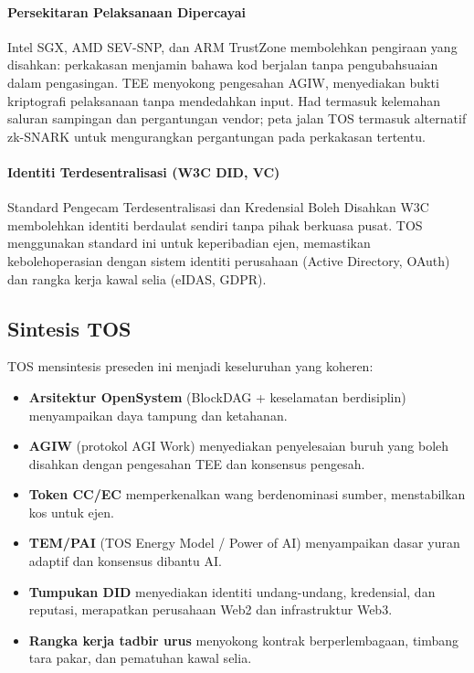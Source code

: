 \documentclass[11pt]{article}
\begin{document}
\paragraph{Persekitaran Pelaksanaan Dipercayai} Intel SGX, AMD SEV-SNP, dan ARM TrustZone membolehkan pengiraan yang disahkan: perkakasan menjamin bahawa kod berjalan tanpa pengubahsuaian dalam pengasingan. TEE menyokong pengesahan AGIW, menyediakan bukti kriptografi pelaksanaan tanpa mendedahkan input. Had termasuk kelemahan saluran sampingan dan pergantungan vendor; peta jalan TOS termasuk alternatif zk-SNARK untuk mengurangkan pergantungan pada perkakasan tertentu.

\paragraph{Identiti Terdesentralisasi (W3C DID, VC)} Standard Pengecam Terdesentralisasi dan Kredensial Boleh Disahkan W3C membolehkan identiti berdaulat sendiri tanpa pihak berkuasa pusat. TOS menggunakan standard ini untuk keperibadian ejen, memastikan kebolehoperasian dengan sistem identiti perusahaan (Active Directory, OAuth) dan rangka kerja kawal selia (eIDAS, GDPR).

\subsection{Sintesis TOS}
TOS mensintesis preseden ini menjadi keseluruhan yang koheren:
\begin{itemize}[noitemsep]
  \item \textbf{Arsitektur OpenSystem} (BlockDAG + keselamatan berdisiplin) menyampaikan daya tampung dan ketahanan.
  \item \textbf{AGIW} (protokol AGI Work) menyediakan penyelesaian buruh yang boleh disahkan dengan pengesahan TEE dan konsensus pengesah.
  \item \textbf{Token CC/EC} memperkenalkan wang berdenominasi sumber, menstabilkan kos untuk ejen.
  \item \textbf{TEM/PAI} (TOS Energy Model / Power of AI) menyampaikan dasar yuran adaptif dan konsensus dibantu AI.
  \item \textbf{Tumpukan DID} menyediakan identiti undang-undang, kredensial, dan reputasi, merapatkan perusahaan Web2 dan infrastruktur Web3.
  \item \textbf{Rangka kerja tadbir urus} menyokong kontrak berperlembagaan, timbang tara pakar, dan pematuhan kawal selia.
\end{itemize}
\end{document}
